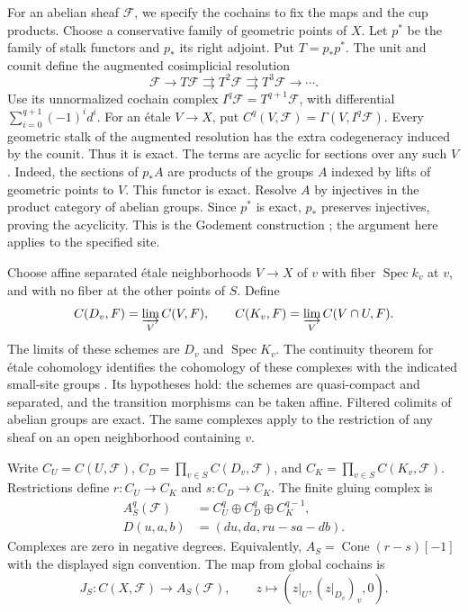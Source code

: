 For an abelian sheaf \(\mathcal F\), we specify the cochains
to fix the maps and the cup products.
Choose a conservative family of geometric points of \(X\).
Let \(p^*\) be the family of stalk functors and \(p_*\) its right
adjoint. Put \(T=p_*p^*\). The unit and counit define the augmented
cosimplicial resolution
\[
 \mathcal F\longrightarrow T\mathcal F
       \rightrightarrows T^2\mathcal F\rightrightarrows T^3\mathcal F
       \longrightarrow\cdots.
\]
Use its unnormalized cochain complex \(I^q\mathcal F=T^{q+1}\mathcal F\),
with differential \(\sum_{i=0}^{q+1}(-1)^id^i\).
For an \'etale \(V\to X\), put
\(C^q(V,\mathcal F)=\Gamma(V,I^q\mathcal F)\).
Every geometric stalk of the augmented resolution has the extra
codegeneracy induced by the counit. Thus it is exact.
The terms are acyclic for sections over any such \(V\).
Indeed, the sections of \(p_*A\) are products of the groups \(A\)
indexed by lifts of geometric points to \(V\). This functor is exact.
Resolve \(A\) by injectives in the product category of abelian groups.
Since \(p^*\) is exact, \(p_*\) preserves injectives, proving the
acyclicity. This is the Godement construction
\cite{do27-Godement}; the argument here applies to the specified site.

Choose affine separated \'etale neighborhoods \(V\to X\) of \(v\)
with fiber \(\operatorname{Spec}k_v\) at \(v\), and with no fiber
at the other points of \(S\). Define
\[
 C(D_v,\mathcal F)=\varinjlim_V C(V,\mathcal F),\qquad
 C(K_v,\mathcal F)=\varinjlim_V C(V\cap U,\mathcal F).
\]
The limits of these schemes are \(D_v\) and \(\operatorname{Spec}K_v\).
The continuity theorem for \'etale cohomology identifies the cohomology
of these complexes with the indicated small-site groups
\cite[Theorem 59.51.3]{do27-Limits}.
Its hypotheses hold: the schemes are quasi-compact and separated,
and the transition morphisms can be taken affine. Filtered colimits
of abelian groups are exact. The same complexes apply to the restriction
of any sheaf on an open neighborhood containing \(v\).

Write \(C_U=C(U,\mathcal F)\),
\(C_D=\prod_{v\in S}C(D_v,\mathcal F)\), and
\(C_K=\prod_{v\in S}C(K_v,\mathcal F)\).
Restrictions define \(r:C_U\to C_K\) and \(s:C_D\to C_K\).
The finite gluing complex is
\begin{equation}
\label{eq:do27-complex}
 \begin{split}
 A_S^q(\mathcal F)&=C_U^q\oplus C_D^q\oplus C_K^{q-1},\\
 D(u,a,b)&=(du,da,ru-sa-db).
 \end{split}
\end{equation}
Complexes are zero in negative degrees. Equivalently,
\(A_S=\operatorname{Cone}(r-s)[-1]\) with the displayed sign
convention. The map from global cochains is
\[
 J_S:C(X,\mathcal F)\longrightarrow A_S(\mathcal F),
 \qquad z\longmapsto(z|_U,(z|_{D_v})_v,0).
\]

